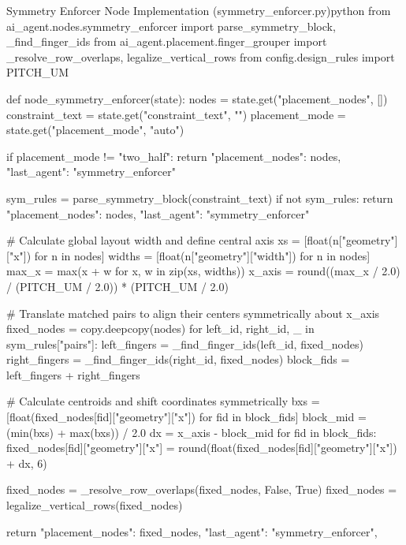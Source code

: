 \begin{thesiscode}{Symmetry Enforcer Node Implementation (symmetry\_enforcer.py)}{python}
from ai_agent.nodes.symmetry_enforcer import parse_symmetry_block, _find_finger_ids
from ai_agent.placement.finger_grouper import _resolve_row_overlaps, legalize_vertical_rows
from config.design_rules import PITCH_UM

def node_symmetry_enforcer(state):
    nodes = state.get("placement_nodes", [])
    constraint_text = state.get("constraint_text", "")
    placement_mode = state.get("placement_mode", "auto")

    if placement_mode != "two_half":
        return {"placement_nodes": nodes, "last_agent": "symmetry_enforcer"}

    sym_rules = parse_symmetry_block(constraint_text)
    if not sym_rules:
        return {"placement_nodes": nodes, "last_agent": "symmetry_enforcer"}

    # Calculate global layout width and define central axis
    xs = [float(n["geometry"]["x"]) for n in nodes]
    widths = [float(n["geometry"]["width"]) for n in nodes]
    max_x = max(x + w for x, w in zip(xs, widths))
    x_axis = round((max_x / 2.0) / (PITCH_UM / 2.0)) * (PITCH_UM / 2.0)

    # Translate matched pairs to align their centers symmetrically about x_axis
    fixed_nodes = copy.deepcopy(nodes)
    for left_id, right_id, _ in sym_rules["pairs"]:
        left_fingers = _find_finger_ids(left_id, fixed_nodes)
        right_fingers = _find_finger_ids(right_id, fixed_nodes)
        block_fids = left_fingers + right_fingers
        
        # Calculate centroids and shift coordinates symmetrically
        bxs = [float(fixed_nodes[fid]["geometry"]["x"]) for fid in block_fids]
        block_mid = (min(bxs) + max(bxs)) / 2.0
        dx = x_axis - block_mid
        for fid in block_fids:
            fixed_nodes[fid]["geometry"]["x"] = round(float(fixed_nodes[fid]["geometry"]["x"]) + dx, 6)
        
    fixed_nodes = _resolve_row_overlaps(fixed_nodes, False, True)
    fixed_nodes = legalize_vertical_rows(fixed_nodes)

    return {
        "placement_nodes": fixed_nodes,
        "last_agent": "symmetry_enforcer",
    }
\end{thesiscode}

